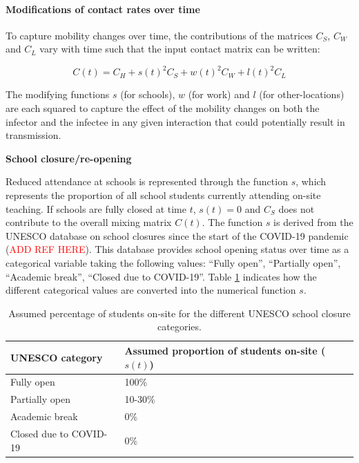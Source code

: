 \paragraph{Modifications of contact rates over time}
To capture mobility changes over time, the contributions of the matrices \(C_{S}\), \(C_{W}\) and \(C_{L}\) vary with time such that the input contact matrix can be written:

\begin{equation}
  C(t)= C_{H}+ s(t)^{2}C_{S}+ w(t)^{2}C_{W}+l(t)^{2}C_{L}
\end{equation}

The modifying functions $s$ (for schools), $w$ (for work) and $l$ (for other-locations) are each squared to capture the effect of the mobility changes on 
both the infector and the infectee in any given interaction that could potentially result in transmission. 

\vspace{5pt}
\textbf{School closure/re-opening}

Reduced attendance at schools is represented through the function $s$, which represents the proportion of all school students 
currently attending on-site teaching. If schools are fully closed at time $t$, \(s(t)=0\) and \(C_{S}\) does not contribute to the overall 
mixing matrix \(C(t)\). 
The function $s$ is derived from the UNESCO database on school closures since the start of the COVID-19 pandemic (\textcolor{red}{ADD REF HERE}).
This database provides school opening status over time as a categorical variable taking the following values: ``Fully open'', ``Partially open'', ``Academic break'', ``Closed due to COVID-19''.
Table \ref{tab:unesco_categories} indicates how the different categorical values are converted into the numerical function $s$.

\begin{table}[ht]  
  \begin{center}
      \begin{tabular}{p{5cm} | p{5cm}}
          \hline
          \textbf{UNESCO category} & \textbf{Assumed proportion of students on-site ($s(t)$)} \\
          \hline
          Fully open & 100\% \\
          Partially open & 10-30\% \\
          Academic break & 0\% \\
          Closed due to COVID-19 & 0\% \\
          \hline
      \end{tabular}
    \end{center}
      \caption{Assumed percentage of students on-site for the different UNESCO school closure categories.}
      \label{tab:unesco_categories}
  \end{table}

